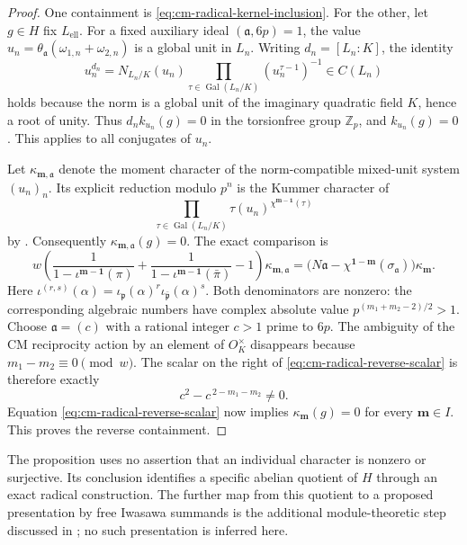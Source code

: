 \documentclass[11pt]{article}
\theoremstyle{definition}\newtheorem{definition}[theorem]{Definition}
\begin{document}
\begin{proof}
One containment is \eqref{eq:cm-radical-kernel-inclusion}.
For the other, let \(g\in H\) fix \(L_{\mathrm{ell}}\).
For a fixed auxiliary ideal \((\mathfrak a,6p)=1\), the value
\(u_n=\theta_{\mathfrak a}(\omega_{1,n}+\omega_{2,n})\)
is a global unit in \(L_n\).
Writing \(d_n=[L_n:K]\), the identity
\[
 u_n^{d_n}
  =N_{L_n/K}(u_n)
       \prod_{\tau\in\operatorname{Gal}(L_n/K)}
                                (u_n^{\tau-1})^{-1}
                         \in C(L_n)
\]
holds because the norm is a global unit of the imaginary
quadratic field \(K\), hence a root of unity.
Thus \(d_n k_{u_n}(g)=0\) in the torsionfree group
\(\mathbb Z_p\), and \(k_{u_n}(g)=0\).
This applies to all conjugates of \(u_n\).

Let \(\kappa_{\boldsymbol m,\mathfrak a}\) denote the moment
character of the norm-compatible mixed-unit system \((u_n)_n\).
Its explicit reduction modulo \(p^n\) is the Kummer character of
\[
 \prod_{\tau\in\operatorname{Gal}(L_n/K)}
             \tau(u_n)^{\chi^{\boldsymbol m-\boldsymbol1}(\tau)}
\]
by \cite[Lemma 4.2, p.~17]{IshiiSoule}.
Consequently \(\kappa_{\boldsymbol m,\mathfrak a}(g)=0\).
The exact comparison
\cite[Proposition 4.3, pp.~17--18]{IshiiSoule} is
\begin{equation}\label{eq:cm-radical-reverse-scalar}
 w\left(\frac1{1-\iota^{\boldsymbol m-\boldsymbol1}(\pi)}
       +\frac1{1-\iota^{\boldsymbol m-\boldsymbol1}(\bar\pi)}
       -1\right)\kappa_{\boldsymbol m,\mathfrak a}
  =\bigl(N\mathfrak a-
           \chi^{\boldsymbol1-\boldsymbol m}(\sigma_{\mathfrak a})
    \bigr)\kappa_{\boldsymbol m}.
\end{equation}
Here
\(\iota^{(r,s)}(\alpha)=
 \iota_{\mathfrak p}(\alpha)^r
 \iota_{\bar{\mathfrak p}}(\alpha)^s\).
Both denominators are nonzero:
the corresponding algebraic numbers have complex absolute value
\(p^{(m_1+m_2-2)/2}>1\).
Choose \(\mathfrak a=(c)\) with a rational integer \(c>1\)
prime to \(6p\).
The ambiguity of the CM reciprocity action by an element of
\(O_K^\times\) disappears because
\(m_1-m_2\equiv0\pmod w\).
The scalar on the right of
\eqref{eq:cm-radical-reverse-scalar} is therefore exactly
\[
                 c^2-c^{\,2-m_1-m_2}\ne0.
\]
Equation \eqref{eq:cm-radical-reverse-scalar} now implies
\(\kappa_{\boldsymbol m}(g)=0\) for every
\(\boldsymbol m\in I\).
This proves the reverse containment.
\end{proof}

The proposition uses no assertion that an individual character is
nonzero or surjective.  Its conclusion identifies a specific
abelian quotient of \(H\) through an exact radical construction.
The further map from this quotient to a proposed presentation by
free Iwasawa summands is the additional module-theoretic step
discussed in \cite[Remark 4.9.1, p.~24]{Ishii}; no such
presentation is inferred here.
\end{document}
